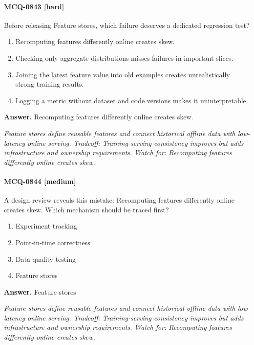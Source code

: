 \paragraph{MCQ-0843 [hard]} Before releasing Feature stores, which failure deserves a dedicated regression test?
\begin{enumerate}[label=\Alph*.]
\item Recomputing features differently online creates skew.
\item Checking only aggregate distributions misses failures in important slices.
\item Joining the latest feature value into old examples creates unrealistically strong training results.
\item Logging a metric without dataset and code versions makes it uninterpretable.
\end{enumerate}
\noindent\textbf{Answer.} Recomputing features differently online creates skew.
\par\textit{Feature stores define reusable features and connect historical offline data with low-latency online serving. Tradeoff: Training-serving consistency improves but adds infrastructure and ownership requirements. Watch for: Recomputing features differently online creates skew.}
\paragraph{MCQ-0844 [medium]} A design review reveals this mistake: Recomputing features differently online creates skew. Which mechanism should be traced first?
\begin{enumerate}[label=\Alph*.]
\item Experiment tracking
\item Point-in-time correctness
\item Data quality testing
\item Feature stores
\end{enumerate}
\noindent\textbf{Answer.} Feature stores
\par\textit{Feature stores define reusable features and connect historical offline data with low-latency online serving. Tradeoff: Training-serving consistency improves but adds infrastructure and ownership requirements. Watch for: Recomputing features differently online creates skew.}
